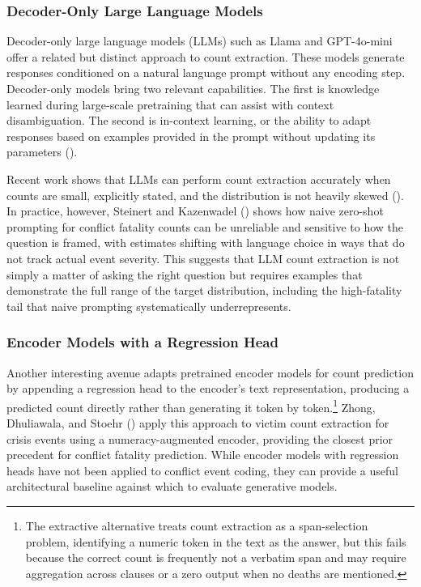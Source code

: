 \documentclass[
  11pt,
]{article}
\begin{document}
\subsubsection{Decoder-Only Large Language
Models}\label{decoder-only-large-language-models}

Decoder-only large language models (LLMs) such as Llama and GPT-4o-mini
offer a related but distinct approach to count extraction. These models
generate responses conditioned on a natural language prompt without any
encoding step. Decoder-only models bring two relevant capabilities. The
first is knowledge learned during large-scale pretraining that can
assist with context disambiguation. The second is in-context learning,
or the ability to adapt responses based on examples provided in the
prompt without updating its parameters ().

Recent work shows that LLMs can perform count extraction accurately when
counts are small, explicitly stated, and the distribution is not heavily
skewed (). In practice,
however, Steinert and Kazenwadel ()
shows how naive zero-shot prompting for conflict fatality counts can be
unreliable and sensitive to how the question is framed, with estimates
shifting with language choice in ways that do not track actual event
severity. This suggests that LLM count extraction is not simply a matter
of asking the right question but requires examples that demonstrate the
full range of the target distribution, including the high-fatality tail
that naive prompting systematically underrepresents.

\subsubsection{Encoder Models with a Regression
Head}\label{encoder-models-with-a-regression-head}

Another interesting avenue adapts pretrained encoder models for count
prediction by appending a regression head to the encoder's text
representation, producing a predicted count directly rather than
generating it token by token.\footnote{The extractive alternative treats
  count extraction as a span-selection problem, identifying a numeric
  token in the text as the answer, but this fails because the correct
  count is frequently not a verbatim span and may require aggregation
  across clauses or a zero output when no deaths are mentioned.} Zhong,
Dhuliawala, and Stoehr () apply this
approach to victim count extraction for crisis events using a
numeracy-augmented encoder, providing the closest prior precedent for
conflict fatality prediction. While encoder models with regression heads
have not been applied to conflict event coding, they can provide a
useful architectural baseline against which to evaluate generative
models.
\end{document}
